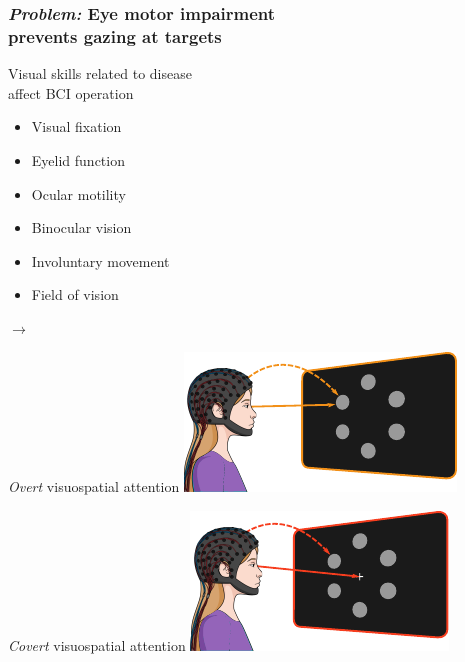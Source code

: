 \documentclass{kul-ulille-beamer}
\begin{document}

\begin{frame}
  \frametitle{\emph{Problem:} Eye motor impairment \\ prevents gazing at targets}

  \begin{minipage}[c]{.4\textwidth}
    \raggedright
    Visual skills related to disease \\ affect BCI
    operation\\
    {\tiny\cite{FriedOken2020}}
  \begin{itemize}
    \item Visual fixation
    \item Eyelid function
    \item Ocular motility
    \item Binocular vision
    \item Involuntary movement
    \item Field of vision
  \end{itemize}
  \end{minipage}\hfill%
  \begin{minipage}[c]{.05\textwidth}
    \centering
      \Huge
      $\rightarrow$
  \end{minipage}\hfill%
  \begin{minipage}[c]{.4\textwidth}
    \centering
    \emph{Overt} visuospatial attention
    \includegraphics[width=.8\textwidth]{figures/intro/attention_overt.pdf}
    \bigskip

    \emph{Covert} visuospatial attention
    \includegraphics[width=.8\textwidth]{figures/intro/attention_covert.pdf}
  \end{minipage}
\end{frame}
\end{document}

